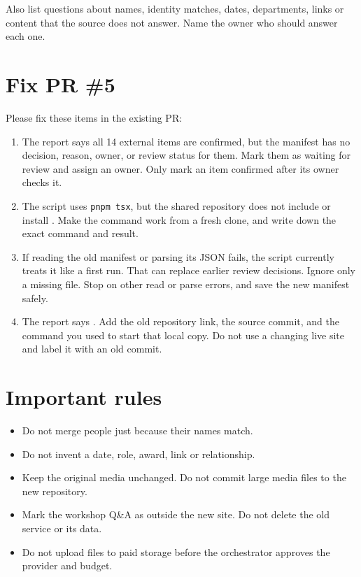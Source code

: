 \documentclass[11pt]{article}
\newcommand{\pathfile}[1]{\path{#1}}
\begin{document}
Also list questions about names, identity matches, dates, departments, links or content that the source does not answer. Name the owner who should answer each one.

\newpage
\section{Fix PR \#5}

Please fix these items in the existing PR:

\begin{enumerate}
\item The report says all 14 external items are confirmed, but the manifest has no decision, reason, owner, or review status for them. Mark them as waiting for review and assign an owner. Only mark an item confirmed after its owner checks it.
\item The script uses \texttt{pnpm\ tsx}, but the shared repository does not include or install \pathfile{tsx}. Make the command work from a fresh clone, and write down the exact command and result.
\item If reading the old manifest or parsing its JSON fails, the script currently treats it like a first run. That can replace earlier review decisions. Ignore only a missing file. Stop on other read or parse errors, and save the new manifest safely.
\item The report says \pathfile{localhost:4173}. Add the old repository link, the source commit, and the command you used to start that local copy. Do not use a changing live site and label it with an old commit.
\end{enumerate}

\section{Important rules}

\begin{itemize}
\item Do not merge people just because their names match.
\item Do not invent a date, role, award, link or relationship.
\item Keep the original media unchanged. Do not commit large media files to the new repository.
\item Mark the workshop Q\&A as outside the new site. Do not delete the old service or its data.
\item Do not upload files to paid storage before the orchestrator approves the provider and budget.
\end{itemize}
\end{document}
